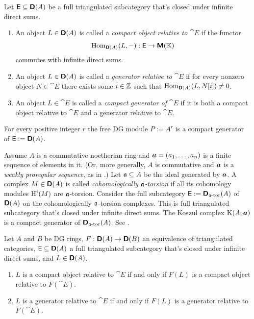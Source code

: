 \begin{dfn} \label{dfn:3431}
Let $\operatorname{\mathsf{E}} \subseteq \boldsymbol{\mathsf{D}}(A)$ be a full triangulated subcategory that's closed 
under infinite direct sums. 
\begin{enumerate}
\item An object $L \in \boldsymbol{\mathsf{D}}(A)$ is called a 
{\em compact object relative to $\cat{E}$}%
if the functor 
\[ \operatorname{Hom}_{\boldsymbol{\mathsf{D}}(A)}(L, -) : \operatorname{\mathsf{E}} \to \boldsymbol{\mathsf{M}}(\mathbb{K}) \]
commutes with infinite direct sums. 

\item An object $L \in \boldsymbol{\mathsf{D}}(A)$ is called a 
{\em generator relative to $\cat{E}$}%
if for every nonzero object $N \in \cat{E}$ there exists some 
$i \in \mathbb{Z}$ such that 
$\operatorname{Hom}_{\boldsymbol{\mathsf{D}}(A)}(L, N[i]) \neq 0$. 

\item An object $L \in \cat{E}$ is called a 
{\em compact generator of $\cat{E}$} 
if it is both a compact object relative to 
$\cat{E}$ and a generator 
relative to $\cat{E}$.
\end{enumerate}
\end{dfn}

\begin{exa} \label{exa:3430}
For every positive integer $r$ the free DG module 
$P := A^r$ is a compact generator of $\operatorname{\mathsf{E}} := \boldsymbol{\mathsf{D}}(A)$.
\end{exa}

\begin{exa} \label{exa:3431}
Assume $A$ is a commutative noetherian ring and 
$\bsym{a} = \lb (a_1, \ldots, a_n)$ is a finite sequence of elements in it. 
(Or, more generally, $A$ is commutative and $\boldsymbol{a}$ is a {\em weakly 
proregular sequence}, as in \cite{PSY}.)
Let $\mathfrak{a} \subseteq A$ be the ideal generated by $\boldsymbol{a}$. 
A complex $M \in \boldsymbol{\mathsf{D}}(A)$ is called {\em cohomologically $\mathfrak{a}$-torsion}
if all its cohomology modules $\operatorname{H}^i(M)$ are $\mathfrak{a}$-torsion. 
Consider the full subcategory 
$\operatorname{\mathsf{E}} := \boldsymbol{\mathsf{D}}_{\mathfrak{a}\textup{-tor}}(A)$ of $\boldsymbol{\mathsf{D}}(A)$ on the 
cohomologically $\mathfrak{a}$-torsion complexes. 
This is full triangulated subcategory that's closed 
under infinite direct sums. 
The Koszul complex $\operatorname{K}(A; \boldsymbol{a})$ is a compact generator of 
$\boldsymbol{\mathsf{D}}_{\mathfrak{a}\textup{-tor}}(A)$. 
See \cite[Proposition 5.1]{PSY2}.
\end{exa}

\begin{prop} \label{prop:3547}
Let $A$ and $B$ be DG rings, $F : \boldsymbol{\mathsf{D}}(A) \to \boldsymbol{\mathsf{D}}(B)$ an 
equivalence of triangulated categories, 
$\operatorname{\mathsf{E}} \subseteq \boldsymbol{\mathsf{D}}(A)$ a full triangulated subcategory that's closed 
under infinite direct sums, and $L \in \boldsymbol{\mathsf{D}}(A)$. 
\begin{enumerate}
\item $L$ is a compact object relative to $\cat{E}$ if and only if 
$F(L)$ is a compact object relative to $F(\cat{E})$. 

\item $L$ is a generator relative to $\cat{E}$ if and only if 
$F(L)$ is a generator relative to $F(\cat{E})$. 
\end{enumerate}
\end{prop}

